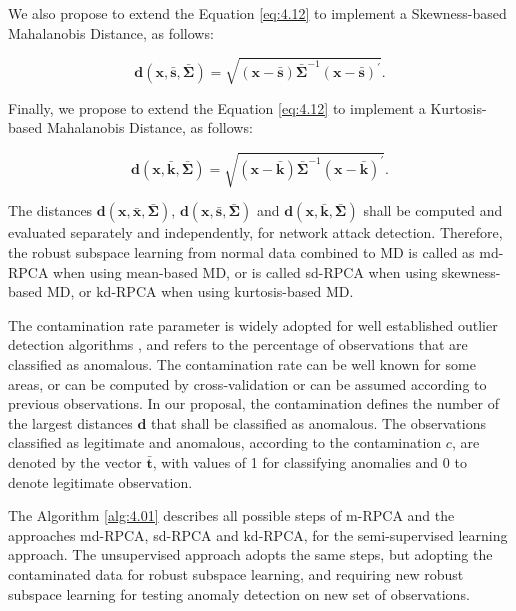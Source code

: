 We also propose to extend the Equation \ref{eq:4.12} to implement a Skewness-based Mahalanobis Distance, as follows:

\begin{equation}\label{eq:4.13}
	\pmb{d}(\pmb{x}, \bar{\pmb{s}}, \bar{\pmb{\Sigma}}) = \sqrt{(\pmb{x} - \bar{\pmb{s}}) \bar{\pmb{\Sigma}}^{-1}(\pmb{x} - \bar{\pmb{s}})^\prime}.
\end{equation}

Finally, we propose to extend the Equation \ref{eq:4.12} to implement a Kurtosis-based Mahalanobis Distance, as follows:

\begin{equation}\label{eq:4.14}
	\pmb{d}(\pmb{x}, \bar{\pmb{k}}, \bar{\pmb{\Sigma}}) = \sqrt{(\pmb{x} - \bar{\pmb{k}}) \bar{\pmb{\Sigma}}^{-1}(\pmb{x} - \bar{\pmb{k}})^\prime}.
\end{equation}

The distances $\pmb{d}(\pmb{x},\bar{\pmb{x}}, \bar{\pmb{\Sigma}})$, $\pmb{d}(\pmb{x}, \bar{\pmb{s}}, \bar{\pmb{\Sigma}})$ and $\pmb{d}(\pmb{x}, \bar{\pmb{k}}, \bar{\pmb{\Sigma}})$ shall be computed and evaluated separately and independently, for network attack detection. Therefore, the robust subspace learning from normal data combined to MD is called as md-RPCA when using mean-based MD, or is called sd-RPCA when using skewness-based MD, or kd-RPCA when using kurtosis-based MD.

The contamination rate parameter is widely adopted for well established outlier detection algorithms \cite{zhao2019pyod}, and refers to the percentage of observations that are classified as anomalous. The contamination rate can be well known for some areas, or can be computed by cross-validation or can be assumed according to previous observations. In our proposal, the contamination defines the number of the largest distances $\pmb{d}$ that shall be classified as anomalous. The observations classified as legitimate and anomalous, according to the contamination $c$, are denoted by the vector $\bar{\pmb{t}}$, with values of 1 for classifying anomalies and 0 to denote legitimate observation.

The Algorithm \ref{alg:4.01} describes all possible steps of m-RPCA and the approaches md-RPCA, sd-RPCA and kd-RPCA, for the semi-supervised learning approach. The unsupervised approach adopts the same steps, but adopting the contaminated data for robust subspace learning, and requiring new robust subspace learning for testing anomaly detection on new set of observations.

